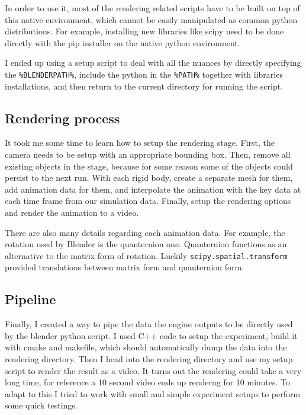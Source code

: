 \documentclass[12pt,a4paper,twoside,openright]{report}
\newcommand{\code}{\texttt}
\begin{document}
In order to use it, most of the rendering related scripts have to be built on top of this native environment, which cannot be easily manipulated as common python distributions. For example, installing new libraries like scipy need to be done directly with the pip installer on the native python environment.

I ended up using a setup script to deal with all the nuances by directly specifying the \code{\%BLENDERPATH\%}, include the python in the \code{\%PATH\%} together with libraries installations, and then return to the current directory for running the script.

\subsection{Rendering process}

It took me some time to learn how to setup the rendering stage. First, the camera needs to be setup with an appropriate bounding box. Then, remove all existing objects in the stage, because for some reason some of the objects could persist to the next run. With each rigid body, create a separate mesh for them, add animation data for them, and interpolate the animation with the key data at each time frame from our simulation data. Finally, setup the rendering options and render the animation to a video.

There are also many details regarding each animation data. For example, the rotation used by Blender is the quanternion one. Quanternion functions as an alternative to the matrix form of rotation. Luckily \code{scipy.spatial.transform} provided translations between matrix form and quanternion form.

\subsection{Pipeline}

Finally, I created a way to pipe the data the engine outputs to be directly used by the blender python script. I used C++ code to setup the experiment, build it with cmake and makefile, which should automatically dump the data into the rendering directory. Then I head into the rendering directory and use my setup script to render the result as a video. It turns out the rendering could take a very long time, for reference a 10 second video ends up renderng for 10 minutes. To adapt to this I tried to work with small and simple experiment setups to perform some quick testings.
\end{document}
